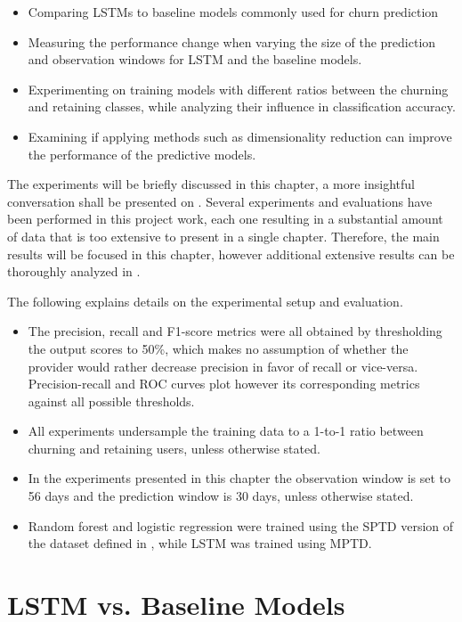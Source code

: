 \documentclass{kththesis}
\begin{document}
\begin{itemize}
\item Comparing LSTMs to baseline models commonly used for churn prediction
\item Measuring the performance change when varying the size of the prediction and observation windows for LSTM and the baseline models.
\item Experimenting on training models with different ratios between the churning and retaining classes, while analyzing their influence in classification accuracy.
\item Examining if applying methods such as dimensionality reduction can improve the performance of the predictive models.
\end{itemize}

The experiments will be briefly discussed in this chapter, a more insightful conversation shall be presented on . Several experiments and evaluations have been performed in this project work, each one resulting in a substantial amount of data that is too extensive to present in a single chapter. Therefore, the main results will be focused in this chapter, however additional extensive results can be thoroughly analyzed in .

The following explains details on the experimental setup and evaluation.

\begin{itemize}
\item The precision, recall and F1-score metrics were all obtained by thresholding the output scores to 50\%, which makes no assumption of whether the provider would rather decrease precision in favor of recall or vice-versa. Precision-recall and ROC curves plot however its corresponding metrics against all possible thresholds.
\item All experiments undersample the training data to a 1-to-1 ratio between churning and retaining users, unless otherwise stated.
\item In the experiments presented in this chapter the observation window is set to 56 days and the prediction window is 30 days, unless otherwise stated.
\item Random forest and logistic regression were trained using the SPTD version of the dataset defined in ,  while LSTM was trained using MPTD.
\end{itemize}

\section{LSTM vs. Baseline Models}
\end{document}
